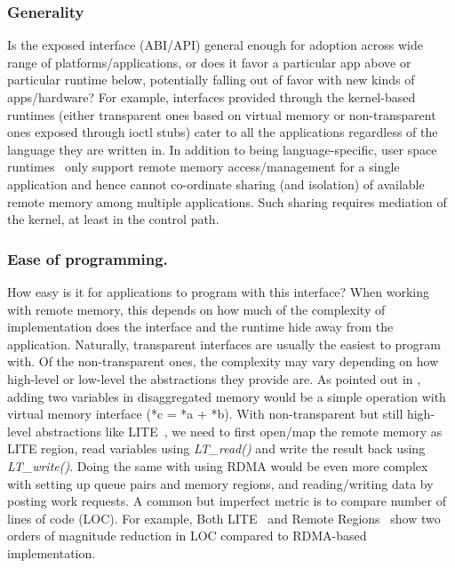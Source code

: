 

\subsubsection{Generality} 
Is the exposed interface (ABI/API) 
general enough for adoption across wide range of 
platforms/applications, or does it favor a particular app 
above or particular runtime below, potentially falling out 
of favor with new kinds of apps/hardware? For example,
interfaces provided through the kernel-based runtimes 
(either transparent ones based on virtual memory or 
non-transparent ones exposed through ioctl stubs) cater to  
all the applications regardless of the language they are 
written in. In addition to being language-specific, user space 
runtimes~\cite{aifm,semeru} only support remote memory 
access/management for a single application and hence cannot 
co-ordinate sharing (and isolation) of available remote 
memory among multiple applications. Such sharing requires 
mediation of the kernel, at least in the control path.


\subsubsection{Ease of programming.} 
How easy is it for applications to program with this interface? 
When working with remote memory, this depends on how much of the 
complexity of implementation does the interface and the runtime 
hide away from the application. Naturally, transparent interfaces
are usually the easiest to program with. Of the non-transparent 
ones, the complexity may vary depending on how high-level or 
low-level the abstractions they provide are. As pointed out in
\cite{Aguilera2017}, adding two variables in disaggregated memory
would be a simple operation with virtual memory interface 
(*c = *a + *b). With non-transparent but still high-level 
abstractions like LITE~\cite{literdma}, we need to first open/map
the remote memory as LITE region, read variables using \textit{
LT\_read()} and write the result back using \textit{LT\_write()}.
Doing the same with using RDMA would be even more complex with 
setting up queue pairs and memory regions, and reading/writing 
data by posting work requests. A common but imperfect metric is 
to compare number of lines of code (LOC). For example, Both
LITE~\cite{literdma} and Remote Regions~\cite{remregions} show 
two orders of magnitude reduction in LOC compared to RDMA-based 
implementation. 
    
